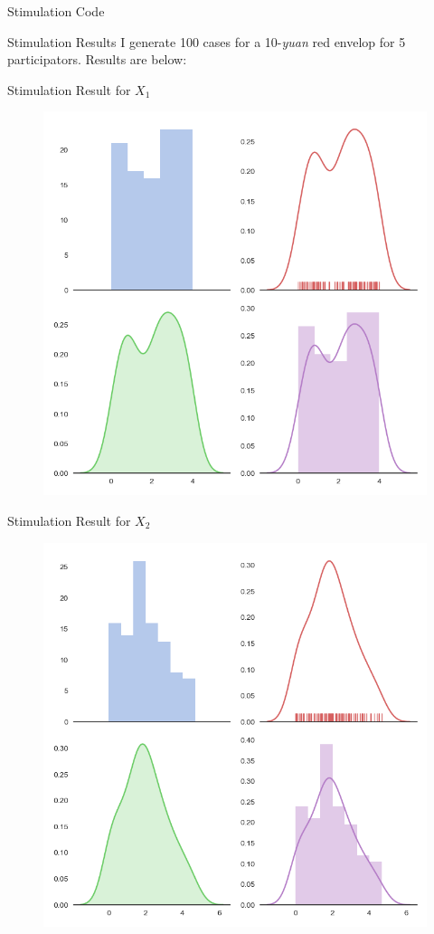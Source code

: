 \documentclass[12pt]{beamer}
\begin{document}
\begin{frame}{Stimulation Code}
\end{frame}

\begin{frame}{Stimulation Results}
	I generate 100 cases for a 10-\emph{yuan} red envelop for 5 participators. Results are below:
\end{frame}

\begin{frame}{Stimulation Result for \(X_1\)}
	\begin{figure}[!ht]
		\centering
		\includegraphics[width=0.7\columnwidth,height=0.6\linewidth]{fig/output_1.png}
	\end{figure}
\end{frame}

\begin{frame}{Stimulation Result for \(X_2\)}
	\begin{figure}[!ht]
		\centering
		\includegraphics[width=0.7\columnwidth,height=0.6\linewidth]{fig/output_2.png}
	\end{figure}
\end{frame}
\end{document}
